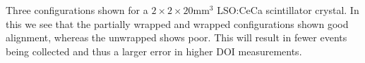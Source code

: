 \label{fig:numberofsamples-20} Three configurations shown for a $2\times2\times20$mm$^3$ LSO:CeCa scintillator crystal. In this we see that the partially wrapped and wrapped configurations shown good alignment, whereas the unwrapped shows poor. This will result in fewer events being collected and thus a larger error in higher DOI measurements.